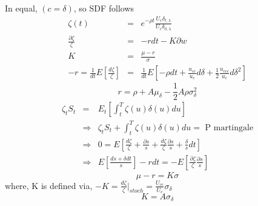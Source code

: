 \documentclass[]{article}
\begin{document}
In equal, $(c= \delta)$, so SDF follows 
\begin{eqnarray*}
\zeta(t) &=& e^{-\rho t} \frac{U_c \delta_{t,\lambda}}{U_c \delta_{0,\lambda}}\\
\frac{\partial \zeta}{\zeta} &=& -rdt - K\partial w\\
K &=& \frac{\mu - r }{\sigma}\\
-r = \frac{1}{dt} E\left[\frac{d\zeta}{\zeta}\right] &=& \frac{1}{dt}E\left[-\rho dt + \frac{u_{cc}}{u_c} d\delta + \frac{1}{2} \frac{u_{ccc}}{u_c} d\delta^2\right]
\end{eqnarray*}
\begin{equation}
r = \rho + A\mu_\delta - \frac{1}{2} A \rho \sigma_\delta^2 \tag{12}
\end{equation}
\begin{eqnarray*}
\zeta_t S_t &=& E_t\left[\int_t^T \zeta(u) \delta(u) du\right]\\
&\Rightarrow & \zeta_t S_t + \int_t^T \zeta(u) \delta(u) du = \mbox{ P martingale}\\
&\Rightarrow & 0 = E\left[\frac{d\zeta}{\zeta} + \frac{\partial s}{s} + \frac{d\zeta}{\zeta}  \frac{\partial s}{s} + \frac{\delta}{s}dt\right]\\
&\Rightarrow & E\left[\frac{ds+\delta dt}{s}\right] - rdt = -E\left[\frac{\partial \zeta}{\zeta} \frac{\partial s}{s}\right]
\end{eqnarray*}
\begin{equation}
\mu - r = K \sigma \tag{13}
\end{equation}
where, K is defined via, $-K = \frac{d\zeta}{\zeta}|_{stoch} = \frac{U_{cc}}{U_c} \sigma_\delta$\\
\begin{equation}
K = A\sigma_\delta \tag{14}
\end{equation}
\end{document}
